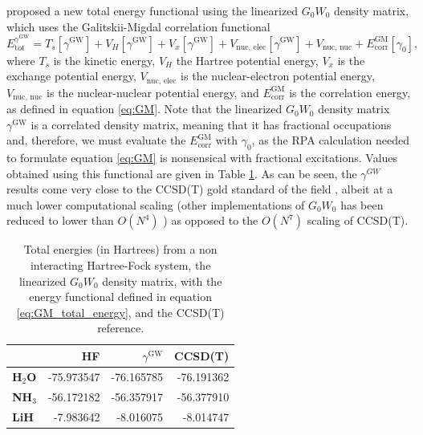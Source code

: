 \documentclass[12pt]{caltech_thesis}
\begin{document}
\newpage
\textcite{bruneval_improved_2021} proposed a new total energy functional using the linearized $G_0W_0$ density matrix, which uses the Galitskii-Migdal correlation functional
\begin{equation}
    E_{\text{tot}}^{\gamma ^{\mathrm{GW}}} = T_s [\gamma ^{\mathrm{GW}}] + V_H [\gamma ^{\mathrm{GW}} ] + V_x [\gamma ^{\mathrm{GW}} ] + V_{\text{nuc, elec}} [\gamma ^{\mathrm{GW}} ] + V_{\text{nuc, nuc}} + E_{\text{corr}} ^{\text{GM}}[\gamma_0],
\label{eq:GM_total_energy}
\end{equation}
where $T_s$ is the kinetic energy, $V_H$ the Hartree potential energy, $V_x$ is the exchange potential energy, $V_{\text{nuc, elec}}$ is the nuclear-electron potential energy, $V_{\text{nuc, nuc}}$ is the nuclear-nuclear potential energy, and $E_{\text{corr}} ^{\text{GM}}$ is the correlation energy, as defined in equation \ref{eq:GM}. Note that the linearized $G_0W_0$ density matrix $\gamma ^{\mathrm{GW}}$ is a correlated density matrix, meaning that it has fractional occupations and, therefore, we must evaluate the $E_{\text{corr}} ^{\text{GM}}$ with $\gamma_0$, as the RPA calculation needed to formulate equation \ref{eq:GM} is nonsensical with fractional excitations. Values obtained using this functional are given in Table \ref{tab:total_energy_gm}. As can be seen, the $\gamma ^{GW}$ results come very close to the CCSD(T) gold standard of the field \autocite{dykstra2011theory}, albeit at a much lower computational scaling (other implementations of $G_0W_0$ has been reduced to lower than $O(N^4)$ \autocite{forster2020low}) as opposed to the $O(N^7)$ scaling of CCSD(T). \autocite{szabo2023linear}
\begin{table}[h!]
    \centering
    \caption{Total energies (in Hartrees) from a non interacting Hartree-Fock system, the linearized $G_0W_0$ density matrix, with the energy functional defined in equation \ref{eq:GM_total_energy}, and the CCSD(T) reference.}
\begin{tabular}{lrrr}
\toprule
& \textbf{HF} & \textbf{$\gamma ^{\mathrm{GW}}$} & \textbf{CCSD(T)} \\
\midrule
\textbf{H$_2$O}& -75.973547 & -76.165785 & -76.191362 \\
\textbf{NH$_3$}& -56.172182 & -56.357917 & -56.377910 \\
\textbf{LiH}& -7.983642 & -8.016075 & -8.014747 \\
\bottomrule
\end{tabular}

\label{tab:total_energy_gm}
\end{table}
\\
\end{document}
